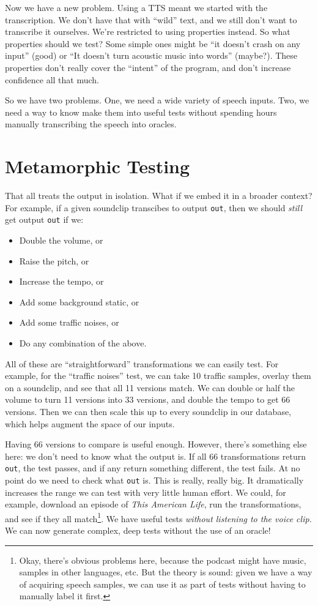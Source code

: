 Now we have a new problem. Using a TTS meant we started with the
transcription. We don't have that with ``wild'' text, and we still don't
want to transcribe it ourselves. We're restricted to using properties
instead. So what properties should we test? Some simple ones might be
``it doesn't crash on any input'' (good) or ``It doesn't turn acoustic
music into words'' (maybe?). These properties don't really cover the
``intent'' of the program, and don't increase confidence all that much.

So we have two problems. One, we need a wide variety of speech inputs.
Two, we need a way to know make them into useful tests without spending
hours manually transcribing the speech into oracles.

\section{Metamorphic Testing}\label{metamorphic-testing}

That all treats the output in isolation. What if we embed it in a
broader context? For example, if a given soundclip transcibes to output
\texttt{out}, then we should \emph{still} get output \texttt{out} if we:

\begin{itemize}
\item
  Double the volume, or
\item
  Raise the pitch, or
\item
  Increase the tempo, or
\item
  Add some background static, or
\item
  Add some traffic noises, or
\item
  Do any combination of the above.
\end{itemize}
All of these are ``straightforward'' transformations we can easily test.
For example, for the ``traffic noises'' test, we can take 10 traffic
samples, overlay them on a soundclip, and see that all 11 versions
match. We can double or half the volume to turn 11 versions into 33
versions, and double the tempo to get 66 versions. Then we can then
scale this up to every soundclip in our database, which helps augment
the space of our inputs.

Having 66 versions to compare is useful enough. However, there's
something else here: we don't need to know what the output is. If all 66
transformations return \texttt{out}, the test passes, and if any return
something different, the test fails. At no point do we need to check
what \texttt{out} is. This is really, really big. It dramatically
increases the range we can test with very little human effort. We could,
for example, download an episode of \emph{This American Life}, run the
transformations, and see if they all
match\footnote{Okay, there's obvious problems here,
  because the podcast might have music, samples in other languages, etc.
  But the theory is sound: given we have a way of acquiring speech
  samples, we can use it as part of tests without having to manually
  label it first.}.
We have useful tests \emph{without listening to the voice clip.} We can
now generate complex, deep tests without the use of an oracle!

